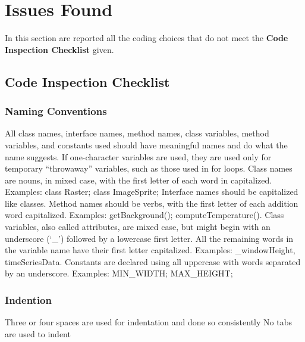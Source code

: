\section{Issues Found}
In this section are reported all the coding choices that do not meet the \textbf{Code Inspection Checklist} given.
%
\subsection{Code Inspection Checklist}
\subsubsection{Naming Conventions}
\begin{itemize}
		All class names, interface names, method names, class variables, method variables, and constants used should have meaningful names and do what the name suggests.
		If one-character variables are used, they are used only for temporary “throwaway” variables, such as those used in for loops.
		Class names are nouns, in mixed case, with the first letter of each word in capitalized. Examples: class Raster; class ImageSprite;
		Interface names should be capitalized like classes.
		Method names should be verbs, with the first letter of each addition word capitalized. Examples: getBackground(); computeTemperature().
		Class variables, also called attributes, are mixed case, but might begin with an underscore (‘\_’) followed by a lowercase first letter. All the remaining words in the variable name have their first letter capitalized. Examples: \_windowHeight, timeSeriesData.
		Constants are declared using all uppercase with words separated by an underscore. Examples: MIN\_WIDTH; MAX\_HEIGHT;
\end{itemize}
%
\subsubsection{Indention}
\begin{itemize}
		Three or four spaces are used for indentation and done so consistently
		No tabs are used to indent
\end{itemize}
%
